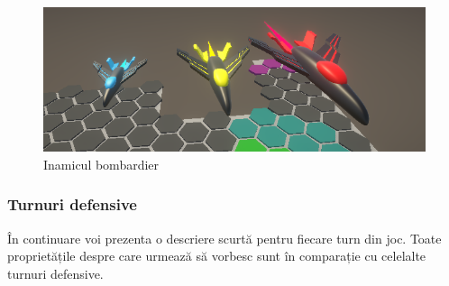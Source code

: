 \documentclass[12pt, a4paper]{article}
\begin{document}
	\begin{figure}[H]
		\centering
		\includegraphics[width=1\textwidth]{Ambusher.png}
		\caption{Inamicul bombardier}
		\label{fig: enemyAmbusher}
	\end{figure}
	
	
	
	\subsubsection{Turnuri defensive}
	
	În continuare voi prezenta o descriere scurtă pentru fiecare turn din joc. Toate proprietățile despre care urmează să vorbesc sunt în comparație cu celelalte turnuri defensive.
	
\end{document}
